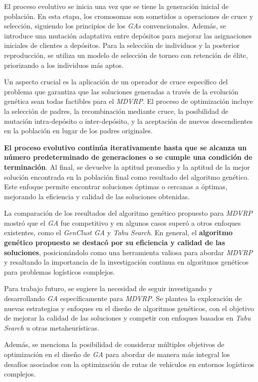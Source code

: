 \documentclass[letter, 10pt]{article}
\begin{document}
El proceso evolutivo se inicia una vez que se tiene la generación inicial de población. En esta etapa, los cromosomas son sometidos a operaciones de cruce y selección, siguiendo los principios de los \textit{GAs} convencionales. Además, se introduce una mutación adaptativa entre depósitos para mejorar las asignaciones iniciales de clientes a depósitos. Para la selección de individuos y la posterior reproducción, se utiliza un modelo de selección de torneo con retención de élite, priorizando a los individuos más aptos.

Un aspecto crucial es la aplicación de un operador de cruce específico del problema que garantiza que las soluciones generadas a través de la evolución genética sean todas factibles para el \textit{MDVRP}. El proceso de optimización incluye la selección de padres, la recombinación mediante cruce, la posibilidad de mutación intra-depósito o inter-depósito, y la aceptación de nuevos descendientes en la población en lugar de los padres originales.

\textbf{El proceso evolutivo continúa iterativamente hasta que se alcanza un número predeterminado de generaciones o se cumple una condición de terminación}. Al final, se devuelve la aptitud promedio y la aptitud de la mejor solución encontrada en la población final como resultado del algoritmo genético. Este enfoque permite encontrar soluciones óptimas o cercanas a óptimas, mejorando la eficiencia y calidad de las soluciones obtenidas.

La comparación de los resultados del algoritmo genético propuesto para \textit{MDVRP} mostró que el \textit{GA} fue competitivo y en algunos casos superó a otros enfoques existentes, como el \textit{GenClust GA} y \textit{Tabu Search}. En general, el \textbf{algoritmo genético propuesto se destacó por su eficiencia y calidad de las soluciones}, posicionándolo como una herramienta valiosa para abordar \textit{MDVRP} y resaltando la importancia de la investigación continua en algoritmos genéticos para problemas logísticos complejos.

Para trabajo futuro, se sugiere la necesidad de seguir investigando y desarrollando \textit{GA} específicamente para \textit{MDVRP}. Se plantea la exploración de nuevas estrategias y enfoques en el diseño de algoritmos genéticos, con el objetivo de mejorar la calidad de las soluciones y competir con enfoques basados en \textit{Tabu Search} u otras metaheurísticas.

Además, se menciona la posibilidad de considerar múltiples objetivos de optimización en el diseño de \textit{GA} para abordar de manera más integral los desafíos asociados con la optimización de rutas de vehículos en entornos logísticos complejos.
\end{document}
